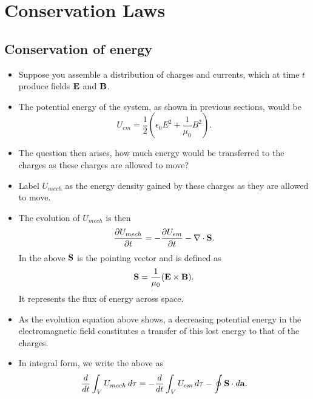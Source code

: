 \documentclass[a4paper,11pt]{report}
\begin{document}
\section{Conservation Laws}
\subsection{Conservation of energy}
\begin{itemize}
    \item Suppose you assemble a distribution of charges and currents, which at time $t$ produce fields $\mathbf{E}$ and $\mathbf{B}$.
    \item The potential energy of the system, as shown in previous sections, would be
    \begin{equation}
        U_{em} = \frac{1}{2} \left ( \epsilon_0 E^2 + \frac{1}{\mu_0} B^2 \right ).
    \end{equation}
    \item The question then arises, how much energy would be transferred to the charges as these charges are allowed to move?
    \item Label $U_{mech}$ as the energy density gained by these charges as they are allowed to move.
    \item The evolution of $U_{mech}$ is then
    \begin{equation}
        \frac{\partial U_{mech}}{\partial t} = -\frac{\partial U_{em}}{\partial t} - \nabla \cdot \mathbf{S}.
    \end{equation}
    In the above $\mathbf{S}$ is the pointing vector and is defined as 
    \begin{equation}
        \mathbf{S} = \frac{1}{\mu_0} ( \mathbf{E} \times \mathbf{B} ).
    \end{equation}
    It represents the flux of energy across space.
    \item As the evolution equation above shows, a decreasing potential energy in the electromagnetic field constitutes a transfer of this lost energy to that of the charges. 
    \item In integral form, we write the above as 
    \begin{equation}
        \frac{d}{dt} \int_V U_{mech} \, d\tau = -\frac{d}{dt} \int_V U_{em} \, d\tau - \oint \mathbf{S} \cdot d\mathbf{a}.
    \end{equation}
\end{itemize}
\end{document}
